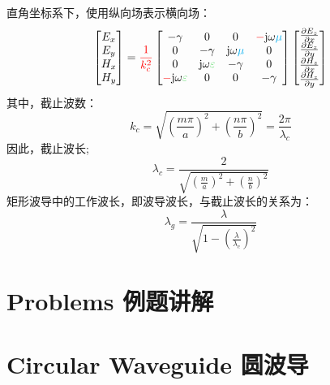     直角坐标系下，使用纵向场表示横向场：
    \begin{equation}
        \begin{bmatrix}
            E_x\\E_y\\H_x\\H_y
        \end{bmatrix}
        ={\color{red}\frac{1}{k_c^2}}\begin{bmatrix}
            -\gamma&0&0&{\color{red}-}\mathrm{j}\omega {\color{cyan}\mu}\\
            0&-\gamma&\mathrm{j}\omega {\color{cyan}\mu}&0\\
            0&\mathrm{j}\omega {\color[RGB]{87,218,101}\varepsilon}&-\gamma&0\\
            {\color{red}-}\mathrm{j}\omega {\color[RGB]{87,218,101}\varepsilon}&0&0&-\gamma\\
        \end{bmatrix}
        \begin{bmatrix}
            \frac{\partial E_z}{\partial x}\\\frac{\partial E_z}{\partial y}\\\frac{\partial H_z}{\partial x}\\\frac{\partial H_z}{\partial y}
        \end{bmatrix}
    \end{equation}
    其中，截止波数：
    \begin{equation}
        k_c=\sqrt{\left(\frac{m\pi}{a}\right)^2+\left(\frac{n\pi}{b}\right)^2}=\frac{2\pi}{\lambda_c}
    \end{equation}
    因此，截止波长;
    \begin{equation}
        \lambda_c=\frac{2}{\sqrt{\left(\frac{m}{a}\right)^2+\left(\frac{n}{b}\right)^2}}
    \end{equation}
    矩形波导中的工作波长，即波导波长，与截止波长的关系为：
    \begin{equation}
        \lambda_g=\frac{\lambda}{\sqrt{1-\left(\frac{\lambda}{\lambda_c}\right)^2}}
    \end{equation}
\section{Problems 例题讲解}

\section{Circular Waveguide 圆波导}

